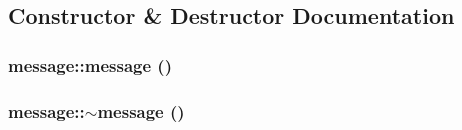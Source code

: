 \subsection{Constructor \& Destructor Documentation}
\hypertarget{classmessage_a6aefe31fa8ce580fdf7d6c8224a5e445}{
\subsubsection[{message}]{\setlength{\rightskip}{0pt plus 5cm}message::message ()}}
\label{classmessage_a6aefe31fa8ce580fdf7d6c8224a5e445}
\hypertarget{classmessage_a3e20db9559213f6eb3dd15cd83af62be}{
\subsubsection[{$\sim$message}]{\setlength{\rightskip}{0pt plus 5cm}message::$\sim$message ()}}
\label{classmessage_a3e20db9559213f6eb3dd15cd83af62be}


